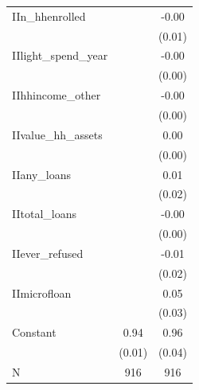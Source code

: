 \begin{table}[htbp]
\begin{tabular}{l*{2}{c}}
IIn\_hhenrolled      &                     &       -0.00         \\
                    &                     &      (0.01)         \\
IIlight\_spend\_year  &                     &       -0.00         \\
                    &                     &      (0.00)         \\
IIhhincome\_other    &                     &       -0.00         \\
                    &                     &      (0.00)         \\
IIvalue\_hh\_assets   &                     &        0.00         \\
                    &                     &      (0.00)         \\
IIany\_loans         &                     &        0.01         \\
                    &                     &      (0.02)         \\
IItotal\_loans       &                     &       -0.00         \\
                    &                     &      (0.00)         \\
IIever\_refused      &                     &       -0.01         \\
                    &                     &      (0.02)         \\
IImicrofloan        &                     &        0.05\sym{*}  \\
                    &                     &      (0.03)         \\
Constant            &        0.94\sym{***}&        0.96\sym{***}\\
                    &      (0.01)         &      (0.04)         \\\addlinespace
\midrule
N                   &         916         &         916         \\
\bottomrule
\end{tabular}
\end{table}
